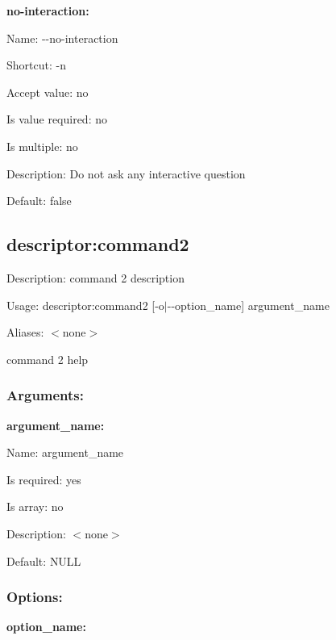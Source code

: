 {\bfseries no-\/interaction\+:}


\begin{DoxyItemize}
\item Name\+: {\ttfamily -\/-\/no-\/interaction}
\item Shortcut\+: {\ttfamily -\/n}
\item Accept value\+: no
\item Is value required\+: no
\item Is multiple\+: no
\item Description\+: Do not ask any interactive question
\item Default\+: {\ttfamily false}
\end{DoxyItemize}

\subsection*{descriptor\+:command2 }


\begin{DoxyItemize}
\item Description\+: command 2 description
\item Usage\+: {\ttfamily descriptor\+:command2 [-\/o$\vert$-\/-\/option\+\_\+name] argument\+\_\+name}
\item Aliases\+: $<$none$>$
\end{DoxyItemize}

command 2 help

\subsubsection*{Arguments\+:}

{\bfseries argument\+\_\+name\+:}


\begin{DoxyItemize}
\item Name\+: argument\+\_\+name
\item Is required\+: yes
\item Is array\+: no
\item Description\+: $<$none$>$
\item Default\+: {\ttfamily N\+U\+L\+L}
\end{DoxyItemize}

\subsubsection*{Options\+:}

{\bfseries option\+\_\+name\+:}


